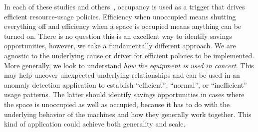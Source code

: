 In each of these studies and others~\cite{AgarwalBDGW11, kaminthermo, buildanomaly}, occupancy is used as a trigger
that drives efficient resource-usage policies.  Efficiency
when unoccupied means shutting everything off and efficiency when a space is occupied means anything
can be turned on.  There is no question this is an excellent way to identify savings opportunities, however, we
take a fundamentally different approach.  We are agnostic to the underlying cause or driver for efficient
policies to be implemented.  More generally, we look to understand \emph{how the equipment is used in
concert}.  This may help uncover unexpected underlying relationships and can be used in an anomaly detection application
to establish ``efficient'', ``normal'', or ``inefficient'' usage patterns.  The latter 
should identify savings opportunities in cases where the space is unoccupied as well 
as occupied, because it has to do with the underlying behavior of the machines and how they generally work
together.  This kind of application could achieve both generality and scale.



